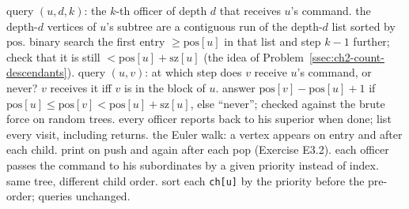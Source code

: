 \begin{variantsbox}
  {query $(u, d, k)$: the $k$-th officer of depth $d$ that receives $u$'s command.}
  {the depth-$d$ vertices of $u$'s subtree are a contiguous run of the depth-$d$ list sorted by $\mathrm{pos}$.}
  {binary search the first entry $\ge \mathrm{pos}[u]$ in that list and step $k-1$ further; check that it is still $< \mathrm{pos}[u]+\mathrm{sz}[u]$ (the idea of Problem~\ref{ssec:ch2-count-descendants}).}
  {query $(u, v)$: at which step does $v$ receive $u$'s command, or never?}
  {$v$ receives it iff $v$ is in the block of $u$.}
  {answer $\mathrm{pos}[v] - \mathrm{pos}[u] + 1$ if $\mathrm{pos}[u] \le \mathrm{pos}[v] < \mathrm{pos}[u]+\mathrm{sz}[u]$, else ``never''; checked against the brute force on random trees.}
  {every officer reports back to his superior when done; list every visit, including returns.}
  {the Euler walk: a vertex appears on entry and after each child.}
  {print on push and again after each pop (Exercise E3.2).}
  {each officer passes the command to his subordinates by a given priority instead of index.}
  {same tree, different child order.}
  {sort each \texttt{ch[u]} by the priority before the pre-order; queries unchanged.}
\end{variantsbox}
